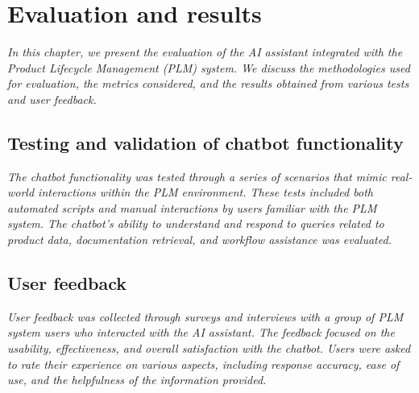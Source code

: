 \chapter{Evaluation and results}
\label{ch:evaluation-and-results}

\textit{In this chapter, we present the evaluation of the AI assistant integrated with the Product Lifecycle Management (PLM) system. We discuss the methodologies used for evaluation, the metrics considered, and the results obtained from various tests and user feedback.}

\section{Testing and validation of chatbot functionality}
\label{sec:testing-and-validation-of-chatbot-functionality}

\textit{The chatbot functionality was tested through a series of scenarios that mimic real-world interactions within the PLM environment. These tests included both automated scripts and manual interactions by users familiar with the PLM system. The chatbot's ability to understand and respond to queries related to product data, documentation retrieval, and workflow assistance was evaluated.}

\section{User feedback}
\label{sec:user-feedback}

\textit{User feedback was collected through surveys and interviews with a group of PLM system users who interacted with the AI assistant. The feedback focused on the usability, effectiveness, and overall satisfaction with the chatbot. Users were asked to rate their experience on various aspects, including response accuracy, ease of use, and the helpfulness of the information provided.}
